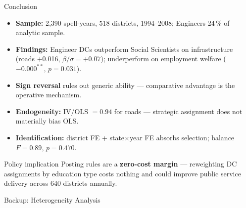 \documentclass[aspectratio=169,10pt]{beamer}
\begin{document}
\begin{frame}{Conclusion}
  \begin{itemize}\setlength\itemsep{7pt}
    \item \textbf{Sample:} 2{,}390 spell-years, 518 districts, 1994--2008;
          Engineers 24\,\% of analytic sample.
    \item \textbf{Findings:} Engineer DCs outperform Social Scientists on
          infrastructure (roads $+$0.016, $\beta/\sigma = +0.07$);
          underperform on employment welfare ($-0.000^{**}$, $p=0.031$).
    \item \textbf{Sign reversal} rules out generic ability —
          comparative advantage is the operative mechanism.
    \item \textbf{Endogeneity:} IV/OLS $= 0.94$ for roads —
          strategic assignment does not materially bias OLS.
    \item \textbf{Identification:} district FE + state$\times$year FE
          absorbs selection; balance $F = 0.89$, $p = 0.470$.
  \end{itemize}
  \vspace{8pt}
  \begin{block}{Policy implication}
    Posting rules are a \textbf{zero-cost margin} — reweighting DC assignments
    by education type costs nothing and could improve public service delivery
    across 640 districts annually.
  \end{block}
\end{frame}

\appendix
\begin{frame}{Backup: Heterogeneity Analysis}
  \begin{center}
  \end{center}
\end{frame}
\end{document}
